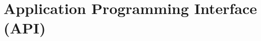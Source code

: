 \section{Application Programming Interface (API)}
\label{sub:application_programming_interface_(api)}